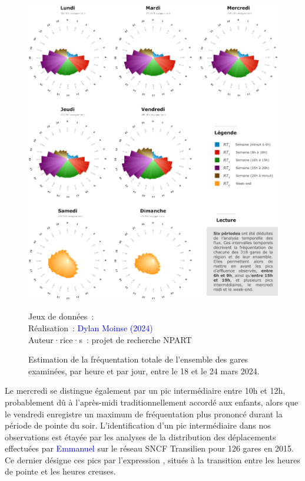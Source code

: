 \begin{refsegment}
    \begin{figure}[h!]\vspace*{4pt}
        \caption{Estimation de la fréquentation totale de l'ensemble des gares examinées, par heure et par jour, entre le 18 et le 24 mars 2024.}
        \label{fig-chap6:resultats-frequentation-periode}
        \centerline{\includegraphics[width=1\columnwidth]{src/Figures/Chap-6/FR_NPART_Flux_frequentation.pdf}}
        \vspace{5pt}
        \begin{flushright}\scriptsize{
        Jeux de données~: \textcolor{blue}{\textcite{google_maps_google_2024}}
        \\
        Réalisation~: \textcolor{blue}{Dylan Moinse (2024)}
        \\
        Auteur·rice·s~: projet de recherche \acrshort{NPART}
        }\end{flushright}
    \end{figure}

Le mercredi se distingue également par un pic intermédiaire entre 10h et 12h, probablement dû à l'après-midi traditionnellement accordé aux enfants, alors que le vendredi enregistre un maximum de fréquentation plus prononcé durant la période de pointe du soir. L'identification d'un pic intermédiaire dans nos observations est étayée par les analyses de la distribution des déplacements effectuées par \textcolor{blue}{Emmanuel} \textcolor{blue}{\textcite[66]{munch_periodes_2017}} sur le réseau SNCF Transilien pour 126 gares en 2015. Ce dernier désigne ces pics par l'expression , situés à la transition entre les heures de pointe et les heures creuses.


\end{refsegment}
